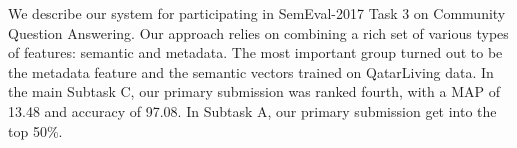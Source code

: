 We describe our system for participating in SemEval-2017 Task 3 on Community Question Answering. Our approach relies on combining a rich set of various types of features: semantic and metadata. The most important group turned out to be the metadata feature and the semantic vectors trained on QatarLiving data. In the main Subtask C, our primary submission was ranked fourth, with a MAP of 13.48 and accuracy of 97.08. In Subtask A, our primary submission get into the top 50\%.
